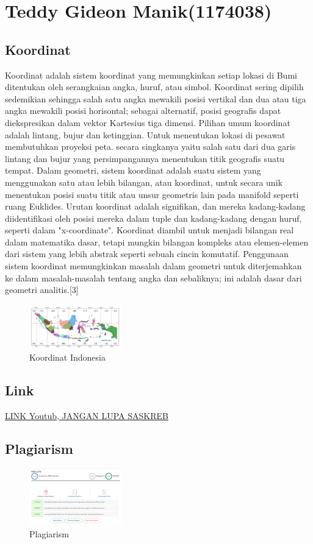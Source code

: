 \section{Teddy Gideon Manik(1174038)}

\subsection{Koordinat}
\par
Koordinat adalah sistem koordinat yang memungkinkan setiap lokasi di Bumi ditentukan oleh serangkaian angka, huruf, atau simbol. Koordinat sering dipilih sedemikian sehingga salah satu angka mewakili posisi vertikal dan dua atau tiga angka mewakili posisi horisontal; sebagai alternatif, posisi geografis dapat diekspresikan dalam vektor Kartesius tiga dimensi. Pilihan umum koordinat adalah lintang, bujur dan ketinggian. Untuk menentukan lokasi di pesawat membutuhkan proyeksi peta. secara singkanya yaitu salah satu dari dua garis lintang dan bujur yang persimpangannya menentukan titik geografis suatu tempat.
Dalam geometri, sistem koordinat adalah suatu sistem yang menggunakan satu atau lebih bilangan, atau koordinat, untuk secara unik menentukan posisi suatu titik atau unsur geometris lain pada manifold seperti ruang Euklides. Urutan koordinat adalah signifikan, dan mereka kadang-kadang diidentifikasi oleh posisi mereka dalam tuple dan kadang-kadang dengan huruf, seperti dalam "x-coordinate". Koordinat diambil untuk menjadi bilangan real dalam matematika dasar, tetapi mungkin bilangan kompleks atau elemen-elemen dari sistem yang lebih abstrak seperti sebuah cincin komutatif. Penggunaan sistem koordinat memungkinkan masalah dalam geometri untuk diterjemahkan ke dalam masalah-masalah tentang angka dan sebaliknya; ini adalah dasar dari geometri analitis.[3]


\begin{figure}[H]
	\includegraphics[width=4cm]{figures/1174038/peta koordinat indonesia.png}
	\centering
	\caption{Koordinat Indonesia}
\end{figure}

\subsection{Link}
\href{https://https://youtu.be/gIAfrXKGDCI}{LINK Youtub, JANGAN LUPA SASKREB}
\subsection{Plagiarism}
\begin{figure}[H]
	\includegraphics[width=4cm]{figures/1174038/plagiarism.png}
	\centering
	\caption{Plagiarism}
\end{figure}